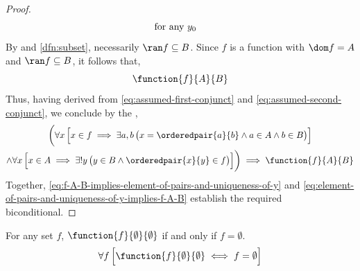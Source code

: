 \begin{proof}
\begin{equation*}
\begin{aligned}
            &\text{for any \( y_{0} \)}
        \end{aligned}
    \end{equation*}
    By  and \cref{dfn:subset}, necessarily \( \ran f \subseteq B \). Since \( f \) is a
    function with \( \dom f = A \) and \( \ran f \subseteq B \), it follows that,
    \begin{equation*}
        \function{f}{A}{B}
    \end{equation*}
    Thus, having derived  from \eqref{eq:assumed-first-conjunct} and \eqref{eq:assumed-second-conjunct},
    we conclude by the ,
    \begin{multline}
        \label{eq:element-of-pairs-and-uniqueness-of-y-implies-f-A-B}
        \bigg(
        \forall x \, \Big[ x \in f \implies \exists a,b \, \big( x = \orderedpair{a}{b} \land a \in A \land b \in B \big) \Big] \\
        \land
        \forall x \, \Big[ x \in A \implies \exists! y \, \big( y \in B \land \orderedpair{x}{y} \in f \big) \Big]
        \bigg)
        \implies
        \function{f}{A}{B}
    \end{multline}
    Together, \eqref{eq:f-A-B-implies-element-of-pairs-and-uniqueness-of-y} and \eqref{eq:element-of-pairs-and-uniqueness-of-y-implies-f-A-B}
    establish the required biconditional.
\end{proof}

\begin{thm}
    \label{thm:f-is-a-function-with-empty-domain-and-empty-range-if-and-only-if-it-is-the-empty-set}
    For any set \( f \), \( \function{f}{\emptyset}{\emptyset} \) if and only if \( f = \emptyset \).
    \begin{equation*}
        \forall f \, \Big[ \function{f}{\emptyset}{\emptyset} \iff f = \emptyset \Big]
    \end{equation*}
\end{thm}

